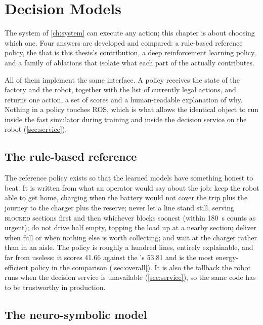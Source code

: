\chapter{Decision Models}
\label{ch:models}

The system of \cref{ch:system} can execute any action; this chapter is about choosing which one.
Four answers are developed and compared: a rule-based reference policy, the \NS that is this
thesis's contribution, a deep reinforcement learning policy, and a family of ablations that
isolate what each part of the \NS actually contributes.

All of them implement the same interface. A policy receives the state of the factory and the
robot, together with the list of currently legal actions, and returns one action, a set of scores
and a human-readable explanation of why. Nothing in a policy touches ROS, which is what allows the
identical object to run inside the fast simulator during training and inside the decision service
on the robot (\cref{sec:service}).

\section{The rule-based reference}
\label{sec:rule-policy}

The reference policy exists so that the learned models have something honest to beat. It is written
from what an operator would say about the job: keep the robot able to get home, charging when the
battery would not cover the trip plus the journey to the charger plus the reserve; never let a line
stand still, serving \textsc{blocked} sections first and then whichever blocks soonest (within
\SI{180}{\second} counts as urgent); do not drive half empty, topping the load up at a nearby
section; deliver when full or when nothing else is worth collecting; and wait at the charger rather
than in an aisle. The policy is roughly a hundred lines, entirely explainable, and far from
useless: it scores \num{41.66} against the \NS's \num{53.81} and is the most energy-efficient policy
in the comparison (\cref{sec:overall}). It is also the fallback the robot runs when the decision
service is unavailable (\cref{sec:service}), so the same code has to be trustworthy in production.

\section{The neuro-symbolic model}
\label{sec:ns-model}

